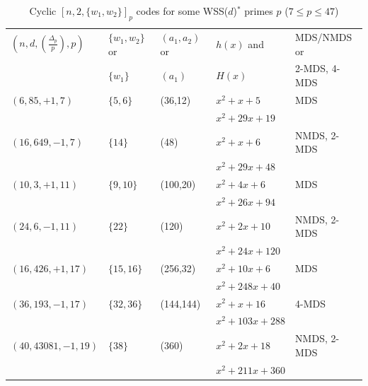 \documentclass[12pt,reqno]{amsart}
\begin{document}
    \begin{table}[htbp]
    \center
	\caption{Cyclic $[n, 2, \{w_1, w_2\}]_p$ codes for some WSS($d$)$^*$ primes $p$ ($7 \le p \le 47$)} \label{tab-two-weight-2}
\scriptsize{
	\begin{tabular}{lllll}
		\toprule
		$(n, d, (\frac{\Delta_p}{p}) ,p)$ & $\{w_1,w_2\}$  or  & $(a_1,a_2)$ or  & $h(x)$ and & MDS/NMDS or \\
		                        &  $\{w_1\}$ & $(a_1)$ & $H(x)$ & 2-MDS, 4-MDS\\
		\toprule
		$(6,85,+1,7)$ & $\{5,6\}$ & (36,12) &   $x^2 +x +5$ & MDS\\
 & & & $x^2+29x+19$  &  \\
		$(16,649,-1,7)$ & $\{14\}$ & (48) &  $x^2 +x +6$  & NMDS, 2-MDS \\
 & & & $x^2+29x+48$  &  \\
\hline
		$(10,3,+1,11)$ & $\{9,10\}$ & (100,20) &  $x^2 +4x +6$  & MDS \\
 & & & $ x^2 + 26x + 94$  &  \\
		$(24,6,-1,11)$ & $\{22\}$ & (120) &  $x^2 +2x +10$ & NMDS, 2-MDS \\
 & & & $ x^2 + 24x + 120$  &  \\
\hline



		$(16,426,+1,17)$ & $\{15,16\}$ & (256,32) &  $x^2 +10x +6$ & MDS\\
& & & $x^2 + 248x + 40$   &  \\

		$(36,193,-1,17)$ & $\{32,36\}$ & (144,144) &  $x^2 +x +16$ & 4-MDS\\
& & & $x^2 + 103x + 288$   &  \\
\hline




		$(40,43081,-1,19)$ & $\{38\}$ & (360) &  $x^2 +2x +18$ & NMDS, 2-MDS \\
& & & $x^2 + 211x + 360$ & \\
\hline


\end{tabular}}
\end{table}
\end{document}

